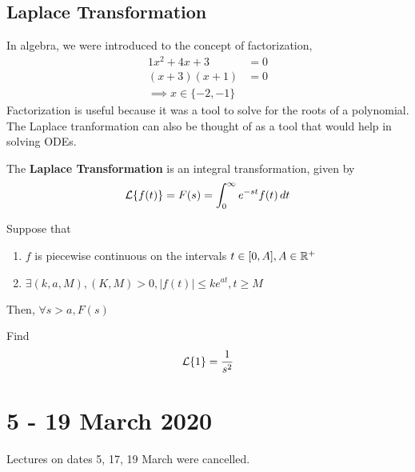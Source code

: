 \documentclass[diffeq.tex]{subfiles}
\begin{document}
    \section{Laplace Transformation}
    In algebra, we were introduced to the concept of factorization,
    \begin{alignat}{1}
        x^{2} + 4x + 3 &= 0 \\
        (x + 3)(x + 1) &= 0 \\
        \implies x \in \{-2, -1\}
    \end{alignat}
    Factorization is useful because it was a tool to solve for the roots of a polynomial. The Laplace tranformation can also be thought of as a tool that would help in solving ODEs.

    \begin{definition}
        The \textbf{Laplace Transformation} is an integral transformation, given by
        \begin{equation}
            \mathcal{L}\{f(t)\} = F(s) = \int_{0}^{\infty}e^{-st}f(t)\,dt
        \end{equation}
    \end{definition}

    \begin{btheorem} %
        Suppose that
        \begin{enumerate}
            \item $f$ is piecewise continuous on the intervals $t\in[0,A], A \in \mathbb{R}^{+}$
            \item $\exists (k, a, M), (K, M) > 0, |f(t)| \leq ke^{at}, t \geq M$
        \end{enumerate}
        Then, $\forall s > a, F(s)$
    \end{btheorem}
    \np
    \begin{example} %
        Find \begin{equation}
            \mathcal{L}\{1\} = \frac{1}{s^{2}}
        \end{equation}
    \end{example}
    \chapter*{5 - 19 March 2020}
    Lectures on dates 5, 17, 19 March were cancelled.
\end{document}
